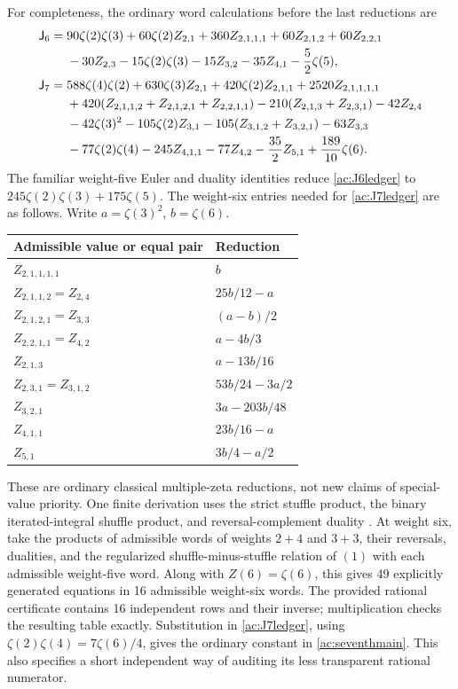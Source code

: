 \documentclass[11pt,a4paper]{article}
\numberwithin{equation}{section}
\theoremstyle{definition}
\theoremstyle{remark}
\begin{document}
For completeness, the ordinary word calculations before the last
reductions are
\begin{align}\label{ac:J6ledger}
 \mathsf J_6={}&90\zeta(2)\zeta(3)+60\zeta(2)Z_{2,1}
       +360Z_{2,1,1,1}+60Z_{2,1,2}+60Z_{2,2,1}\notag\\
 &-30Z_{2,3}-15\zeta(2)\zeta(3)-15Z_{3,2}
       -35Z_{4,1}-\frac52\zeta(5),\\
 \mathsf J_7={}&588\zeta(4)\zeta(2)+630\zeta(3)Z_{2,1}
       +420\zeta(2)Z_{2,1,1}+2520Z_{2,1,1,1,1}\notag\\
 &+420(Z_{2,1,1,2}+Z_{2,1,2,1}+Z_{2,2,1,1})
       -210(Z_{2,1,3}+Z_{2,3,1})-42Z_{2,4}\notag\\
 &-42\zeta(3)^2-105\zeta(2)Z_{3,1}
       -105(Z_{3,1,2}+Z_{3,2,1})-63Z_{3,3}\notag\\
 &-77\zeta(2)\zeta(4)-245Z_{4,1,1}-77Z_{4,2}
       -\frac{35}{2}Z_{5,1}+\frac{189}{10}\zeta(6).
       \label{ac:J7ledger}
\end{align}
The familiar weight-five Euler and duality identities reduce
\eqref{ac:J6ledger} to $245\zeta(2)\zeta(3)+175\zeta(5)$.
The weight-six entries needed for \eqref{ac:J7ledger} are as
follows. Write $a=\zeta(3)^2$, $b=\zeta(6)$.
\begin{center}
\small
\begin{tabular}{ll}
\hline
Admissible value or equal pair & Reduction\\
\hline
$Z_{2,1,1,1,1}$ & $b$\\
$Z_{2,1,1,2}=Z_{2,4}$ & $25b/12-a$\\
$Z_{2,1,2,1}=Z_{3,3}$ & $(a-b)/2$\\
$Z_{2,2,1,1}=Z_{4,2}$ & $a-4b/3$\\
$Z_{2,1,3}$ & $a-13b/16$\\
$Z_{2,3,1}=Z_{3,1,2}$ & $53b/24-3a/2$\\
$Z_{3,2,1}$ & $3a-203b/48$\\
$Z_{4,1,1}$ & $23b/16-a$\\
$Z_{5,1}$ & $3b/4-a/2$\\
\hline
\end{tabular}
\end{center}
These are ordinary classical multiple-zeta reductions, not new
claims of special-value priority. One finite derivation uses the
strict stuffle product, the binary iterated-integral shuffle product,
and reversal-complement duality \cite{IKZ}. At weight six,
take the products of admissible words of weights $2+4$ and $3+3$,
their reversals, dualities, and the regularized shuffle-minus-stuffle
relation of $(1)$ with each admissible weight-five word. Along with
$Z(6)=\zeta(6)$, this gives 49 explicitly generated equations in
16 admissible weight-six words. The provided rational certificate
contains 16 independent rows and their inverse; multiplication
checks the resulting table exactly. Substitution in
\eqref{ac:J7ledger}, using
$\zeta(2)\zeta(4)=7\zeta(6)/4$, gives the ordinary constant in
\eqref{ac:seventhmain}. This also specifies a short independent
way of auditing its less transparent rational numerator.
\end{document}
